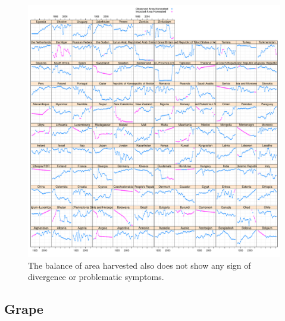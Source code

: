 \documentclass[nojss]{jss}\usepackage[]{graphicx}\usepackage[]{color}
\makeatletter
\def\maxwidth{ %
  \ifdim\Gin@nat@width>\linewidth
    \linewidth
  \else
    \Gin@nat@width
  \fi
}
\newenvironment{knitrout}{}{} %
\makeatother
\begin{document}
\begin{knitrout}
\color{fgcolor}\begin{figure}[!ht]


{\centering \includegraphics[width=\maxwidth]{figure/wheat-areaharvested-imputed} 

}

\caption[The balance of area harvested also does not show any sign of divergence or problematic symptoms]{The balance of area harvested also does not show any sign of divergence or problematic symptoms.\label{fig:wheat-areaharvested-imputed}}
\end{figure}


\end{knitrout}

\FloatBarrier
\subsection{Grape}
\end{document}
